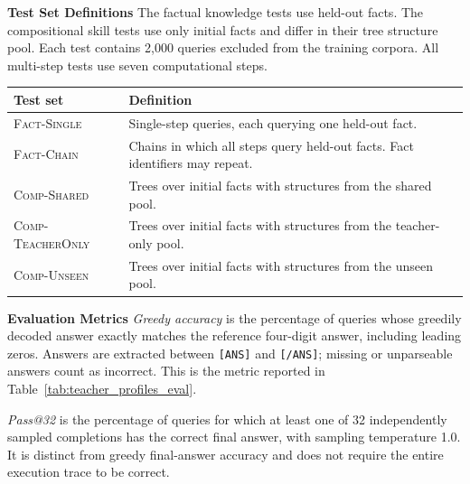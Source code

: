 \documentclass[]{template}
\theoremstyle{plain}
\theoremstyle{definition}
\theoremstyle{remark}
\renewcommand{\paragraph}[1]{\vspace{1mm}\noindent\textbf{#1}}
\begin{document}
\paragraph{Test Set Definitions}
The factual knowledge tests use held-out facts. The compositional skill tests use only initial facts and differ in their tree structure pool. Each test contains 2,000 queries excluded from the training corpora. All multi-step tests use seven computational steps.

\begin{center}
\small
\begin{tabularx}{\textwidth}{@{}l>{\raggedright\arraybackslash\leavevmode}X@{}}
\toprule
Test set & Definition \\
\midrule
\textsc{Fact-Single} & Single-step queries, each querying one held-out fact. \\
\textsc{Fact-Chain} & Chains in which all steps query held-out facts. Fact identifiers may repeat. \\
\textsc{Comp-Shared} & Trees over initial facts with structures from the shared pool. \\
\textsc{Comp-TeacherOnly} & Trees over initial facts with structures from the teacher-only pool. \\
\textsc{Comp-Unseen} & Trees over initial facts with structures from the unseen pool. \\
\bottomrule
\end{tabularx}
\end{center}

\paragraph{Evaluation Metrics}
\emph{Greedy accuracy} is the percentage of queries whose greedily decoded answer exactly matches the reference four-digit answer, including leading zeros. Answers are extracted between \texttt{[ANS]} and \texttt{[/ANS]}; missing or unparseable answers count as incorrect. This is the metric reported in Table~\ref{tab:teacher_profiles_eval}.

\emph{Pass@32} is the percentage of queries for which at least one of 32 independently sampled completions has the correct final answer, with sampling temperature 1.0. It is distinct from greedy final-answer accuracy and does not require the entire execution trace to be correct.
\end{document}
